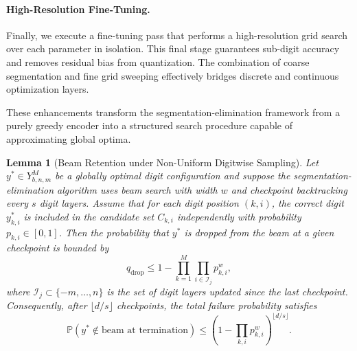 \documentclass[aps,twocolumn,superscriptaddress,nofootinbib]{revtex4}
\newtheorem{lemma}{Lemma}
\begin{document}
\paragraph{High-Resolution Fine-Tuning.} Finally, we execute a fine-tuning pass that performs a high-resolution grid search over each parameter in isolation. This final stage guarantees sub-digit accuracy and removes residual bias from quantization. The combination of coarse segmentation and fine grid sweeping effectively bridges discrete and continuous optimization layers.

These enhancements transform the segmentation-elimination framework from a purely greedy encoder into a structured search procedure capable of approximating global optima.

\begin{lemma}[Beam Retention under Non-Uniform Digitwise Sampling]
Let \( y^* \in Y_{b,n,m}^M \) be a globally optimal digit configuration and suppose the segmentation-elimination algorithm uses beam search with width \( w \) and checkpoint backtracking every \( s \) digit layers. Assume that for each digit position \( (k,i) \), the correct digit \( y^*_{k,i} \) is included in the candidate set \( C_{k,i} \) independently with probability \( p_{k,i} \in [0,1] \). Then the probability that \( y^* \) is dropped from the beam at a given checkpoint is bounded by
\begin{equation}
q_{\text{drop}} \leq 1 - \prod_{k=1}^M \prod_{i \in \mathcal{I}_j} p_{k,i}^w, \label{eq:q_drop}
\end{equation}
where \( \mathcal{I}_j \subset \{-m,\dots,n\} \) is the set of digit layers updated since the last checkpoint. Consequently, after \( \lfloor d / s \rfloor \) checkpoints, the total failure probability satisfies
\begin{equation}
\mathbb{P}(y^* \notin \text{beam at termination}) \leq \left(1 - \prod_{k,i} p_{k,i}^w\right)^{\lfloor d/s \rfloor}. \label{eq:q_beam_term}
\end{equation}
\end{lemma}
\end{document}
